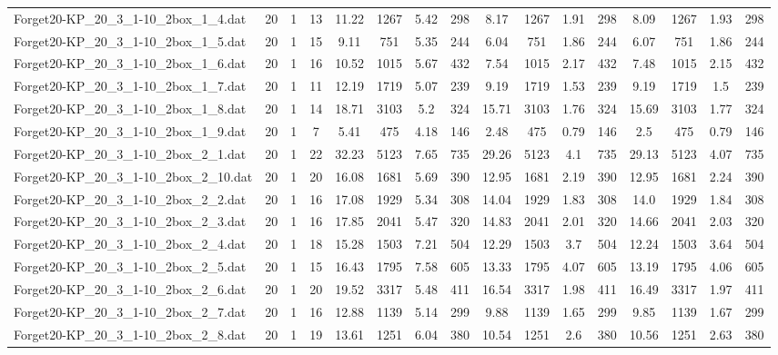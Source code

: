 \begin{sidewaystable}[!ht]
{\begin{tabular}{lccccccccccccccc}
Forget20-KP\_20\_3\_1-10\_2box\_1\_4.dat & 20 & 1 & 13 & 11.22 & 1267 & 5.42 & 298 & 8.17 & 1267 & 1.91 & 298 & 8.09 & 1267 & 1.93 & 298 \\
Forget20-KP\_20\_3\_1-10\_2box\_1\_5.dat & 20 & 1 & 15 & 9.11 & 751 & 5.35 & 244 & 6.04 & 751 & 1.86 & 244 & 6.07 & 751 & 1.86 & 244 \\
Forget20-KP\_20\_3\_1-10\_2box\_1\_6.dat & 20 & 1 & 16 & 10.52 & 1015 & 5.67 & 432 & 7.54 & 1015 & 2.17 & 432 & 7.48 & 1015 & 2.15 & 432 \\
Forget20-KP\_20\_3\_1-10\_2box\_1\_7.dat & 20 & 1 & 11 & 12.19 & 1719 & 5.07 & 239 & 9.19 & 1719 & 1.53 & 239 & 9.19 & 1719 &  \textcolor{blue2}{1.5} & 239 \\
Forget20-KP\_20\_3\_1-10\_2box\_1\_8.dat & 20 & 1 & 14 & 18.71 & 3103 & 5.2 & 324 & 15.71 & 3103 & 1.76 & 324 & 15.69 & 3103 & 1.77 & 324 \\
Forget20-KP\_20\_3\_1-10\_2box\_1\_9.dat & 20 & 1 & 7 & 5.41 & 475 & 4.18 & 146 & 2.48 & 475 &  \textcolor{blue2}{0.79} & 146 & 2.5 & 475 &  \textcolor{blue2}{0.79} & 146 \\
Forget20-KP\_20\_3\_1-10\_2box\_2\_1.dat & 20 & 1 & 22 & 32.23 & 5123 & 7.65 & 735 & 29.26 & 5123 & 4.1 & 735 & 29.13 & 5123 & 4.07 & 735 \\
Forget20-KP\_20\_3\_1-10\_2box\_2\_10.dat & 20 & 1 & 20 & 16.08 & 1681 & 5.69 & 390 & 12.95 & 1681 & 2.19 & 390 & 12.95 & 1681 & 2.24 & 390 \\
Forget20-KP\_20\_3\_1-10\_2box\_2\_2.dat & 20 & 1 & 16 & 17.08 & 1929 & 5.34 & 308 & 14.04 & 1929 & 1.83 & 308 & 14.0 & 1929 & 1.84 & 308 \\
Forget20-KP\_20\_3\_1-10\_2box\_2\_3.dat & 20 & 1 & 16 & 17.85 & 2041 & 5.47 & 320 & 14.83 & 2041 & 2.01 & 320 & 14.66 & 2041 & 2.03 & 320 \\
Forget20-KP\_20\_3\_1-10\_2box\_2\_4.dat & 20 & 1 & 18 & 15.28 & 1503 & 7.21 & 504 & 12.29 & 1503 & 3.7 & 504 & 12.24 & 1503 & 3.64 & 504 \\
Forget20-KP\_20\_3\_1-10\_2box\_2\_5.dat & 20 & 1 & 15 & 16.43 & 1795 & 7.58 & 605 & 13.33 & 1795 & 4.07 & 605 & 13.19 & 1795 & 4.06 & 605 \\
Forget20-KP\_20\_3\_1-10\_2box\_2\_6.dat & 20 & 1 & 20 & 19.52 & 3317 & 5.48 & 411 & 16.54 & 3317 & 1.98 & 411 & 16.49 & 3317 & 1.97 & 411 \\
Forget20-KP\_20\_3\_1-10\_2box\_2\_7.dat & 20 & 1 & 16 & 12.88 & 1139 & 5.14 & 299 & 9.88 & 1139 & 1.65 & 299 & 9.85 & 1139 & 1.67 & 299 \\
Forget20-KP\_20\_3\_1-10\_2box\_2\_8.dat & 20 & 1 & 19 & 13.61 & 1251 & 6.04 & 380 & 10.54 & 1251 & 2.6 & 380 & 10.56 & 1251 & 2.63 & 380 \\

\end{tabular}}
\end{sidewaystable}
